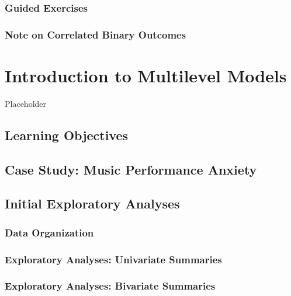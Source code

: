 \documentclass[
]{krantz}
\begin{document}
\hypertarget{guided-exercises-4}{%
\subsection{Guided Exercises}\label{guided-exercises-4}}

\hypertarget{note-on-correlated-binary-outcomes}{%
\subsection{Note on Correlated Binary Outcomes}\label{note-on-correlated-binary-outcomes}}

\hypertarget{ch-multilevelintro}{%
\chapter{Introduction to Multilevel Models}\label{ch-multilevelintro}}

Placeholder

\hypertarget{learning-objectives-7}{%
\section{Learning Objectives}\label{learning-objectives-7}}

\hypertarget{cs:music}{%
\section{Case Study: Music Performance Anxiety}\label{cs:music}}

\hypertarget{explore}{%
\section{Initial Exploratory Analyses}\label{explore}}

\hypertarget{organizedata1}{%
\subsection{Data Organization}\label{organizedata1}}

\hypertarget{explore1}{%
\subsection{Exploratory Analyses: Univariate Summaries}\label{explore1}}

\hypertarget{explore2}{%
\subsection{Exploratory Analyses: Bivariate Summaries}\label{explore2}}
\end{document}
